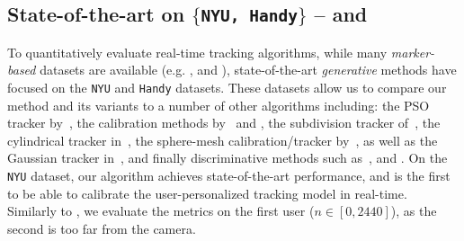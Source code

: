 

\subsection{State-of-the-art on $\{$\texttt{NYU, Handy}$\}$ --
 and }
\label{sec:evalstar}
To quantitatively evaluate real-time tracking algorithms, while many \emph{marker-based} datasets are available (e.g. \cite{qian2014realtime}, \cite{sharp2015accurate} and \cite{yuan2017bighand}), state-of-the-art \emph{generative} methods have focused on the \texttt{NYU} \cite{tompson2014real} and \texttt{Handy} \cite{tkach2016sphere} datasets. 
These datasets allow us to compare our method and its variants to a number of other algorithms including: the PSO tracker by~\cite{sharp2015accurate}, the calibration methods by~\cite{khamis2015learning} and \cite{tan2016fits}, the subdivision tracker of~\cite{taylor2016joint}, the cylindrical tracker in~\cite{htrack}, the sphere-mesh calibration/tracker by~\cite{tkach2016sphere}, as well as the Gaussian tracker in~\cite{sridhar2015fast}, and finally discriminative methods such as~\cite{tompson2014real}, \cite{tang2015opening} and \cite{oberweger2015hands}. 
% 
On the \texttt{NYU} dataset, our algorithm achieves state-of-the-art performance, and is the first to be able to calibrate the user-personalized tracking model in real-time. Similarly to \cite{taylor2016joint}, we evaluate the metrics on the first user ($n \in [0, 2440]$), as the second is too far from the camera.
%
